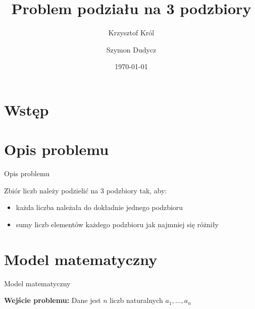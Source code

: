 \documentclass{beamer}
\title{Problem podziału na 3 podzbiory}
\author{
       Krzysztof Król\and
                Szymon Dudycz
}
\date{\today}
\begin{document}
\section{Wstęp}
\begin{frame}
  \titlepage
\end{frame}


\section{Opis problemu}

\begin{frame}{Opis problemu}

Zbiór liczb należy podzielić na 3 podzbiory tak, aby:
\begin{itemize}  
\item każda liczba należała do dokładnie jednego podzbioru
\item sumy liczb elementów każdego podzbioru jak najmniej się różniły
\end{itemize}


\end{frame}


\section{Model matematyczny}

\begin{frame}[t]{Model matematyczny}

\textbf{Wejście problemu:} Dane jest $n$ liczb naturalnych $a_1,\dots,a_n$


\end{frame}
\end{document}
